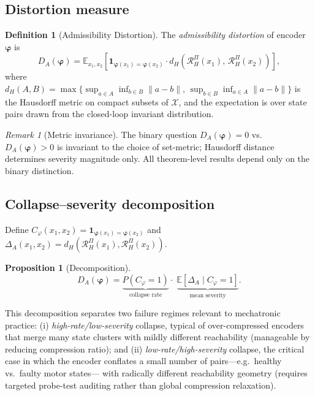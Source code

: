 \documentclass[10pt,twocolumn]{article}
\theoremstyle{plain}
\newtheorem{proposition}{Proposition}
\theoremstyle{definition}
\newtheorem{definition}{Definition}
\theoremstyle{remark}
\newtheorem{remark}{Remark}
\newcommand{\DA}{D_{A}(\bm{\varphi})}
\newcommand{\RHP}{\mathcal{R}_{H}^{\Pi}}
\newcommand{\calX}{\mathcal{X}}
\newcommand{\bvphi}{\bm{\varphi}}
\newcommand{\E}{\mathbb{E}}
\begin{document}
\subsection{Distortion measure}

\begin{definition}[Admissibility Distortion]
\label{def:distortion}
The \emph{admissibility distortion} of encoder $\bvphi$ is
\begin{equation}
  \DA = \E_{x_1,x_2}\!\left[
    \mathbf{1}_{\bvphi(x_1)=\bvphi(x_2)}
    \cdot d_H\!\left(\RHP(x_1),\,\RHP(x_2)\right)
  \right],
  \label{eq:DA}
\end{equation}
where $d_H(A,B) = \max\{\sup_{a\in A}\inf_{b\in B}\|a-b\|,\,
\sup_{b\in B}\inf_{a\in A}\|a-b\|\}$ is the Hausdorff metric on compact
subsets of $\calX$, and the expectation is over state pairs drawn from the
closed-loop invariant distribution.
\end{definition}

\begin{remark}[Metric invariance]
The binary question $\DA = 0$ vs.\ $\DA > 0$ is invariant to the choice
of set-metric; Hausdorff distance determines severity magnitude only.
All theorem-level results depend only on the binary distinction.
\end{remark}

\subsection{Collapse--severity decomposition}

Define $C_\varphi(x_1,x_2) = \mathbf{1}_{\bvphi(x_1)=\bvphi(x_2)}$ and
$\Delta_A(x_1,x_2) = d_H(\RHP(x_1),\RHP(x_2))$.

\begin{proposition}[Decomposition]
\label{prop:decomp}
\begin{equation}
  \DA = \underbrace{P(C_\varphi=1)}_{\text{collapse rate}}
  \cdot\; \underbrace{\E[\Delta_A \mid C_\varphi=1]}_{\text{mean severity}}.
  \label{eq:decomp}
\end{equation}
\end{proposition}

This decomposition separates two failure regimes relevant to mechatronic
practice: (i) \emph{high-rate/low-severity} collapse, typical of
over-compressed encoders that merge many state clusters with mildly different
reachability (manageable by reducing compression ratio); and (ii)
\emph{low-rate/high-severity} collapse, the critical case in which the encoder
conflates a small number of pairs---e.g.\ healthy vs.\ faulty motor states---
with radically different reachability geometry (requires targeted probe-test
auditing rather than global compression relaxation).
\end{document}
